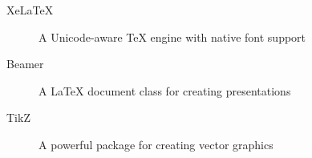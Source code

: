 \begin{description}
    \item[XeLaTeX] A Unicode-aware TeX engine with native font support
    \item[Beamer] A \LaTeX{} document class for creating presentations
    \item[TikZ] A powerful package for creating vector graphics
\end{description}
